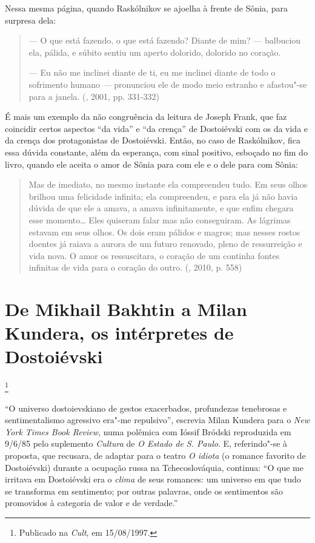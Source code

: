 Nessa mesma página, quando Raskólnikov se ajoelha à frente de Sônia,
para surpresa dela:

\begin{quote}
--- O que está fazendo, o que está fazendo? Diante de mim? --- balbuciou
ela, pálida, e súbito sentiu um aperto dolorido, dolorido no coração.

--- Eu não me inclinei diante de ti, eu me inclinei diante de todo o
sofrimento humano --- pronunciou ele de modo meio estranho e afastou"-se
para a janela. (, 2001, pp. 331-332)
\end{quote}

É mais um exemplo da não congruência da leitura de Joseph Frank, que faz
coincidir certos aspectos ``da vida'' e ``da crença'' de Dostoiévski com
os da vida e da crença dos protagonistas de Dostoiévski. Então, no caso
de Raskólnikov, fica essa dúvida constante, além da esperança, com sinal
positivo, esboçado no fim do livro, quando ele aceita o amor de Sônia
para com ele e o dele para com Sônia:

\begin{quote}
Mas de imediato, no mesmo instante ela compreendeu tudo. Em seus olhos
brilhou uma felicidade infinita; ela compreendeu, e para ela já não
havia dúvida de que ele a amava, a amava infinitamente, e que enfim
chegara esse momento\ldots{} Eles quiseram falar mas não conseguiram. As
lágrimas estavam em seus olhos. Os dois eram pálidos e magros; mas
nesses rostos doentes já raiava a aurora de um futuro renovado, pleno de
ressurreição e vida nova. O amor os ressuscitara, o coração de um
continha fontes infinitas de vida para o coração do outro. (, 2010, p. 558)
\end{quote}

\chapter{De Mikhail Bakhtin a Milan Kundera, os intérpretes de
Dostoiévski}\footnote{Publicado na \emph{Cult}, em 15/08/1997.}

``O universo dostoievskiano de gestos exacerbados, profundezas
tenebrosas e sentimen­talismo agressivo era"-me repulsivo'', escrevia
Milan Kundera para o \emph{New York Times Book Review}, numa polêmica
com Ióssif Bródski reproduzida em 9/6/85 pelo suplemento \emph{Cultura}
de \emph{O Estado de S. Paulo}. E, referindo"-se à proposta, que
recusara, de adaptar para o teatro \emph{O idiota} (o romance favorito
de Dostoiévski) durante a ocupação russa na Tchecoslováquia, continua:
``O que me irritava em Dostoiévski era o \emph{clima} de seus romances:
um universo em que tudo se transforma em sentimento; por outras
palavras, onde os sentimentos são promovidos à categoria de valor e de
verdade.''

